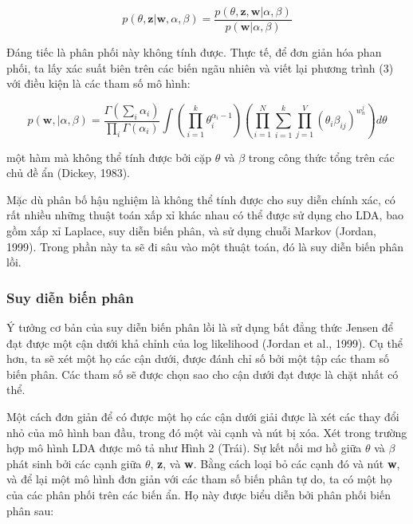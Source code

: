 \documentclass[12pt,a4paper]{article}
\begin{document}
\begin{equation} 
p(\theta, \textbf{z} | \textbf{w}, \alpha, \beta) = \dfrac{p(\theta, \textbf{z}, \textbf{w} | \alpha, \beta)}{p(\textbf{w} | \alpha, \beta)}
\end{equation}

\noindent
Đáng tiếc là phân phối này không tính được. Thực tế, để đơn giản hóa phan phối, ta lấy xác suất biên trên các biến ngãu nhiên và viết lại phương trình (3) với điều kiện là các tham số mô hình:

\begin{equation} 
p(\textbf{w}, | \alpha, \beta) = \dfrac{\Gamma (\sum_i {\alpha}_i)}{\prod_i \Gamma (\alpha_i)} \int \left(\prod_{i=1}^{k} {\theta}_{i}^{{\alpha}_i - 1} \right) \left(\prod_{i=1}^{N} \sum_{i=1}^{k} \prod_{j=1}^{V} (\theta_i {\beta}_{ij})^{w_{n}^{j}} \right)d\theta
\end{equation}

\noindent
một hàm mà không thể tính được bởi cặp $\theta$ và $\beta$ trong công thức tổng trên các chủ đề ẩn (Dickey, 1983).


Mặc dù phân bố hậu nghiệm là không thể tính được cho suy diễn chính xác, có rất nhiều những thuật toán xấp xỉ khác nhau có thể được sử dụng cho LDA, bao gồm xấp xỉ Laplace, suy diễn biến phân, và sử dụng chuỗi Markov (Jordan, 1999). Trong phần này ta sẽ đi sâu vào một thuật toán, đó là suy diễn biến phân lồi.


\subsubsection{Suy diễn biến phân}

Ý tưởng cơ bản của suy diễn biến phân lồi là sử dụng bất đẳng thức Jensen để đạt được một cận dưới khả chỉnh của log likelihood (Jordan et al., 1999). Cụ thể hơn, ta sẽ xét một họ các cận dưới, được đánh chỉ số bởi một tập các tham số biến phân. Các tham số sẽ được chọn sao cho cận dưới đạt được là chặt nhất có thể.


Một cách đơn giản để có được một họ các cận dưới giải được là xét các thay đổi nhỏ của mô hình ban đầu, trong đó một vài cạnh và nút bị xóa. Xét trong trường hợp mô hình LDA được mô tả như Hình 2 (Trái). Sự kết nối mơ hồ giữa $\theta$ và $\beta$ phát sinh bởi các cạnh giữa $\theta$, \textbf{z}, và \textbf{w}. Bằng cách loại bỏ các cạnh đó và nút \textbf{w}, và để lại một mô hình đơn giản với các tham số biến phân tự do, ta có một họ của các phân phối trên các biến ẩn. Họ này được biểu diễn bởi phân phối biến phân sau:
\end{document}
